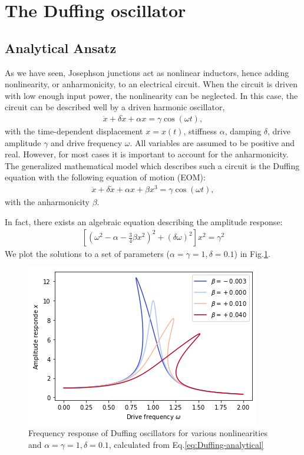 \section{The Duffing oscillator}

\subsection{Analytical Ansatz}
As we have seen, Josephson junctions act as nonlinear inductors, hence adding nonlinearity, or anharmonicity, to an electrical circuit.
When the circuit is driven with low enough input power, the nonlinearity can be neglected.
In this case, the circuit can be described well by a driven harmonic oscillator,
\begin{align}
\ddot{x} + \delta \dot{x} + \alpha x = \gamma \cos(\omega t),
\end{align}
with the time-dependent displacement  $x=x(t)$, stiffness $\alpha$, damping $\delta$, drive amplitude $\gamma$ and drive frequency $\omega$.
All variables are assumed to be positive and real.
However, for most cases it is important to account for the anharmonicity.
The generalized mathematical model which describes such a circuit is the Duffing equation with the following equation of motion (EOM)\cite{hamelGeorgDuffingIngenieur1921}:
\begin{align}
\ddot{x} + \delta \dot{x} + \alpha x + \beta x^3 = \gamma \cos(\omega t),
\end{align}
with the anharmonicity $\beta$.

In fact, there exists an algebraic equation describing the amplitude response\cite{jordanNonlinearOrdinaryDifferential2007}:
\begin{align}
\left[ \left( \omega^2-\alpha-\frac{3}{4}\beta x^2 \right)^2 + \left( \delta\omega \right)^2 \right] x^2 = \gamma^2
\label{eq:Duffing-analytical}
\end{align}
We plot the solutions to a set of parameters ($\alpha=\gamma=1,\delta=0.1$) in Fig.\ref{fig:duffing}.

\begin{figure}
	\centering
	\includegraphics[width=0.7\linewidth]{chapter-theory/figs-general/duffing}
	\caption{Frequency response of Duffing oscillators for various nonlinearities and $\alpha=\gamma=1,\delta=0.1$, calculated from Eq.\ref{eq:Duffing-analytical}}
	\label{fig:duffing}
\end{figure}

